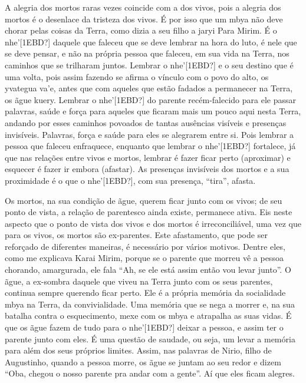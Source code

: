 \documentclass{article}
\begin{document}
A alegria dos mortos raras vezes coincide com a dos vivos, pois a
alegria dos mortos \'e o desenlace da tristeza dos vivos. \'E por isso
que um mbya n\~ao deve chorar pelas coisas da Terra, como dizia a seu
filho a jaryi Para Mirim. \'E o nhe{\textquoteright}[1EBD?] daquele que
faleceu que se deve lembrar na hora do luto, \'e nele que se deve
pensar, e n\~ao na pr\'opria pessoa que faleceu, em sua vida na Terra,
nos caminhos que se trilharam juntos. Lembrar o
nhe{\textquoteright}[1EBD?] e o seu destino que \'e uma volta, pois
assim fazendo se afirma o v\'inculo com o povo do alto, os yvategua
va{\textquoteright}e, antes que com aqueles que est\~ao fadados a
permanecer na Terra, os \~ague kuery. Lembrar o
nhe{\textquoteright}[1EBD?] do parente rec\'em-falecido para ele passar
palavras, sa\'ude e for\c{c}a para aqueles que ficaram mais um pouco
aqui nesta Terra, andando por esses caminhos povoados de tantas
aus\^encias vis\'iveis e presen\c{c}as invis\'iveis. Palavras,
for\c{c}a e sa\'ude para eles se alegrarem entre si. Pois lembrar a
pessoa que faleceu enfraquece, enquanto que lembrar o
nhe{\textquoteright}[1EBD?] fortalece, j\'a que nas rela\c{c}\~oes
entre vivos e mortos, lembrar \'e fazer ficar perto (aproximar) e
esquecer \'e fazer ir embora (afastar). As presen\c{c}as invis\'iveis
dos mortos e a sua proximidade \'e o que o nhe{\textquoteright}[1EBD?],
com sua presen\c{c}a, {\textquotedblleft}tira{\textquotedblright},
afasta.

Os mortos, na sua condi\c{c}\~ao de \~ague, querem ficar junto com os
vivos; de seu ponto de vista, a rela\c{c}\~ao de parentesco ainda
existe, permanece ativa. Eis neste aspecto que o ponto de vista dos
vivos e dos mortos \'e irreconcili\'avel, uma vez que para os vivos, os
mortos s\~ao ex-parentes.  Este afastamento, que pode ser refor\c{c}ado
de diferentes maneiras, \'e necess\'ario por v\'arios motivos. Dentre
eles, como me explicava Karai Mirim, porque se o parente que morreu
v\^e a pessoa chorando, amargurada, ele fala {\textquotedblleft}Ah, se
ele est\'a assim ent\~ao vou levar junto{\textquotedblright}. O \~ague,
a ex-sombra daquele que viveu na Terra junto com os seus parentes,
continua sempre querendo ficar perto. Ele \'e a pr\'opria mem\'oria da
socialidade mbya na Terra, da convivialidade. Uma mem\'oria que se nega
a morrer e, na sua batalha contra o esquecimento, mexe com os mbya e
atrapalha as suas vidas. \'E que os \~ague fazem de tudo para o
nhe{\textquoteright}[1EBD?] deixar a pessoa, e assim ter o parente
junto com eles. \'E uma quest\~ao de saudade, ou seja, um levar a
mem\'oria para al\'em dos seus pr\'oprios limites. Assim, nas palavras
de Nirio, filho de Augustinho, quando a pessoa morre, os \~ague se
juntam ao seu redor e dizem {\textquotedblleft}Oba, chegou o nosso
parente pra andar com a gente{\textquotedblright}.  A\'i que eles ficam
alegres.
\end{document}
